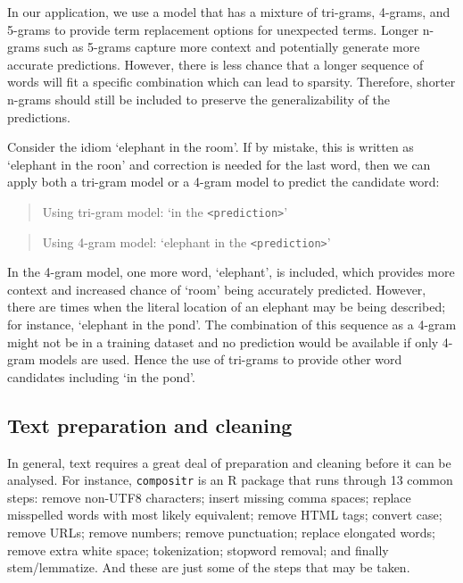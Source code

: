 \documentclass[11pt,]{article}
\begin{document}
In our application, we use a model that has a mixture of tri-grams, 4-grams, and 5-grams to provide term replacement options for unexpected terms. Longer n-grams such as 5-grams capture more context and potentially generate more accurate predictions. However, there is less chance that a longer sequence of words will fit a specific combination which can lead to sparsity. Therefore, shorter n-grams should still be included to preserve the generalizability of the predictions.

Consider the idiom `elephant in the room'. If by mistake, this is written as `elephant in the roon' and correction is needed for the last word, then we can apply both a tri-gram model or a 4-gram model to predict the candidate word:

\begin{quote}
Using tri-gram model: `in the \texttt{\textless{}prediction\textgreater{}}'
\end{quote}

\begin{quote}
Using 4-gram model: `elephant in the \texttt{\textless{}prediction\textgreater{}}'
\end{quote}

In the 4-gram model, one more word, `elephant', is included, which provides more context and increased chance of `room' being accurately predicted. However, there are times when the literal location of an elephant may be being described; for instance, `elephant in the pond'. The combination of this sequence as a 4-gram might not be in a training dataset and no prediction would be available if only 4-gram models are used. Hence the use of tri-grams to provide other word candidates including `in the pond'.

\hypertarget{text-preparation-and-cleaning}{%
\subsection{Text preparation and cleaning}\label{text-preparation-and-cleaning}}

In general, text requires a great deal of preparation and cleaning before it can be analysed. For instance, \texttt{compositr} \citep{citecompositr} is an R package that runs through 13 common steps: remove non-UTF8 characters; insert missing comma spaces; replace misspelled words with most likely equivalent; remove HTML tags; convert case; remove URLs; remove numbers; remove punctuation; replace elongated words; remove extra white space; tokenization; stopword removal; and finally stem/lemmatize. And these are just some of the steps that may be taken.
\end{document}
